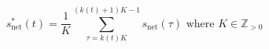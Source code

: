 \begin{equation}
	s^{*}_\text{net}(t) = \frac{1}{K}\sum_{\tau=k(t)K}^{(k(t)+1)K-1}s_\text{net}(\tau) \text{ where } K \in \mathbb{Z}_{>0}
	\label{ch1:equ:down-sampling-to-half-hourly}
\end{equation}